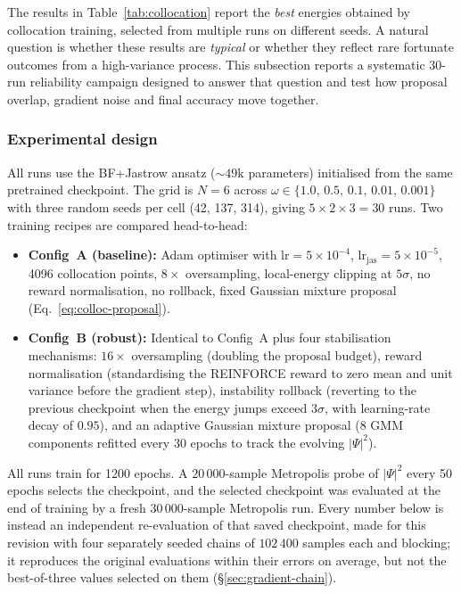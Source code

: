 The results in Table~\ref{tab:collocation} report the \emph{best} energies
obtained by collocation training, selected from multiple runs on different
seeds.
A natural question is whether these results are \emph{typical} or whether
they reflect rare fortunate outcomes from a high-variance process.
This subsection reports a systematic 30-run reliability campaign designed
to answer that question and test how proposal overlap, gradient noise and final accuracy
move together.

\subsubsection{Experimental design}

All runs use the BF+Jastrow ansatz (${\sim}49\text{k}$ parameters)
initialised from the same pretrained checkpoint.
The grid is $N{=}6$ across
$\omega\in\{1.0,\,0.5,\,0.1,\,0.01,\,0.001\}$ with three random
seeds per cell (42, 137, 314), giving $5\times 2\times 3 = 30$ runs.
Two training recipes are compared head-to-head:

\begin{itemize}
\item \textbf{Config~A (baseline):} Adam optimiser with
  $\text{lr}{=}5{\times}10^{-4}$, $\text{lr}_{\text{jas}}{=}5{\times}10^{-5}$,
  4096 collocation points, $8{\times}$ oversampling, local-energy
  clipping at $5\sigma$, no reward normalisation, no rollback, fixed
  Gaussian mixture proposal (Eq.~\eqref{eq:colloc-proposal}).

\item \textbf{Config~B (robust):} Identical to Config~A plus four
  stabilisation mechanisms: $16{\times}$ oversampling (doubling the
  proposal budget), reward normalisation (standardising the REINFORCE
  reward to zero mean and unit variance before the gradient step),
  instability rollback (reverting to the previous checkpoint when the
  energy jumps exceed $3\sigma$, with learning-rate decay of $0.95$),
  and an adaptive Gaussian mixture proposal (8 GMM components refitted
  every 30 epochs to track the evolving $|\Psi|^2$).
\end{itemize}

All runs train for 1200 epochs.
A $20\,000$-sample Metropolis probe of $|\Psi|^2$ every 50 epochs selects the checkpoint, and
the selected checkpoint was evaluated at the end of training by a fresh $30\,000$-sample
Metropolis run. Every number below is instead an independent re-evaluation of that saved
checkpoint, made for this revision with four separately seeded chains of $102\,400$ samples
each and blocking; it reproduces the original evaluations within their errors on average,
but not the best-of-three values selected on them (\S\ref{sec:gradient-chain}).

